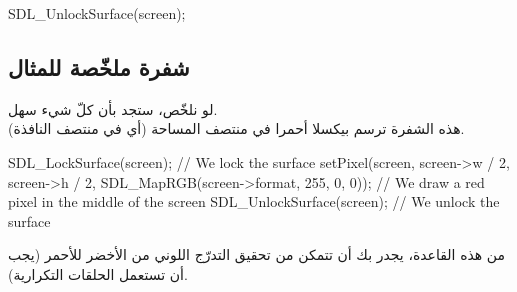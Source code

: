 \begin{Csource}
SDL_UnlockSurface(screen);
\end{Csource}

\subsection{شفرة  ملخّصة للمثال}

لو نلخّص، ستجد بأن كلّ شيء سهل.\\
هذه الشفرة ترسم بيكسلا أحمرا في منتصف المساحة
(أي في منتصف النافذة).

\begin{Csource}
SDL_LockSurface(screen); // We lock the surface
setPixel(screen, screen->w / 2, screen->h / 2, SDL_MapRGB(screen->format, 255, 0, 0)); // We draw a red pixel in the middle of the screen
SDL_UnlockSurface(screen); // We unlock the surface
\end{Csource}

من هذه القاعدة، يجدر بك أن تتمكن من تحقيق التدرّج اللوني من الأخضر للأحمر (يجب أن تستعمل الحلقات التكرارية).
